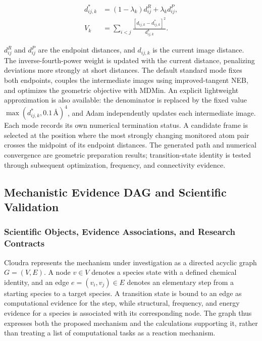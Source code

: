 \begin{equation}\label{eq:methods-8}
\begin{aligned}
d^*_{ij,k}&=(1-\lambda_k)d^R_{ij}+\lambda_k d^P_{ij},\\
V_k&=\sum_{i<j}\frac{[d_{ij,k}-d^*_{ij,k}]^2}{d_{ij,k}^{4}}.
\end{aligned}
\end{equation}

$d^R_{ij}$ and $d^P_{ij}$ are the endpoint distances, and $d_{ij,k}$ is the current image distance. The inverse-fourth-power weight is updated with the current distance, penalizing deviations more strongly at short distances. The default standard mode fixes both endpoints, couples the intermediate images using improved-tangent NEB, and optimizes the geometric objective with MDMin. An explicit lightweight approximation is also available: the denominator is replaced by the fixed value $\max(d^*_{ij,k},0.1\,\text{Å})^4$, and Adam independently updates each intermediate image. Each mode records its own numerical termination status. A candidate frame is selected at the position where the most strongly changing monitored atom pair crosses the midpoint of its endpoint distances. The generated path and numerical convergence are geometric preparation results; transition-state identity is tested through subsequent optimization, frequency, and connectivity evidence.

\subsection{Mechanistic Evidence DAG and Scientific Validation}

\subsubsection{Scientific Objects, Evidence Associations, and Research Contracts}

Cloudra represents the mechanism under investigation as a directed acyclic graph $G=(V,E)$. A node $v\in V$ denotes a species state with a defined chemical identity, and an edge $e=(v_i,v_j)\in E$ denotes an elementary step from a starting species to a target species. A transition state is bound to an edge as computational evidence for the step, while structural, frequency, and energy evidence for a species is associated with its corresponding node. The graph thus expresses both the proposed mechanism and the calculations supporting it, rather than treating a list of computational tasks as a reaction mechanism.

